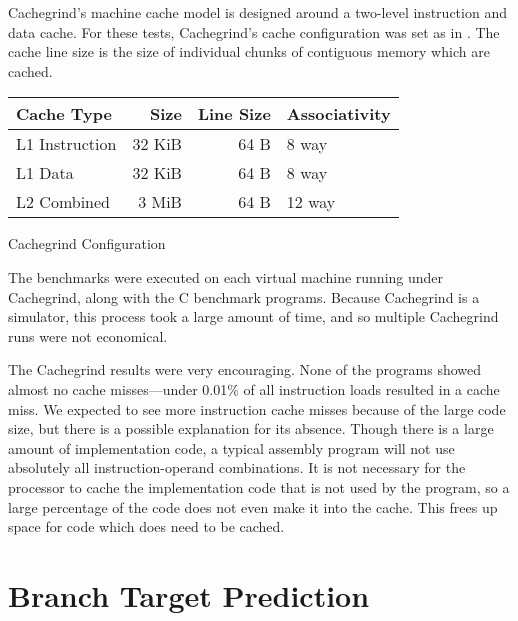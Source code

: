 		Cachegrind's machine cache model is designed around a two-level instruction and data cache. For these tests, Cachegrind's cache configuration was set as in . The cache line size is the size of individual chunks of contiguous memory which are cached.
		
		\begin{myfigure}
			\begin{tabular}{|l|r|r|l|}
				\hline
				Cache Type & Size & Line Size & Associativity \\
				\hline
				L1 Instruction & 32 KiB & 64 B & 8 way \\
				\hline
				L1 Data & 32 KiB & 64 B & 8 way \\
				\hline
				L2 Combined & 3 MiB & 64 B & 12 way \\
				\hline
			\end{tabular}
			\caption{Cachegrind Configuration}
			\label{fig:cacheconfig}
		\end{myfigure}
	
		The benchmarks were executed on each virtual machine running under Cachegrind, along with the C benchmark programs. Because Cachegrind is a simulator, this process took a large amount of time, and so multiple Cachegrind runs were not economical. 
		
		The Cachegrind results were very encouraging. None of the programs showed almost no cache misses---under 0.01\% of all instruction loads resulted in a cache miss. We expected to see more instruction cache misses because of the large code size, but there is a possible explanation for its absence. Though there is a large amount of implementation code, a typical assembly program will not use absolutely all instruction-operand combinations. It is not necessary for the processor to cache the implementation code that is not used by the program, so a large percentage of the code does not even make it into the cache. This frees up space for code which does need to be cached.
		
		\section{Branch Target Prediction}
		
